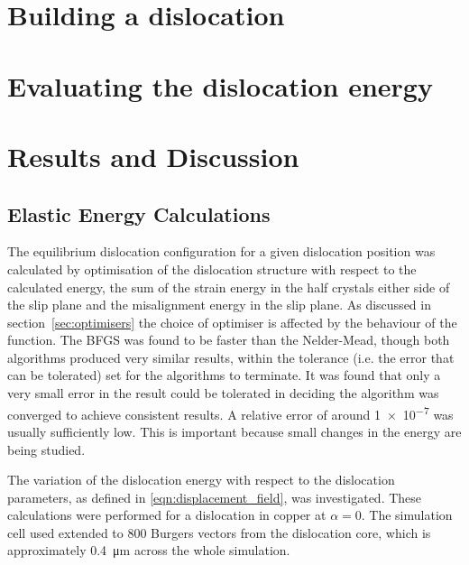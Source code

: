 \section{Building a dislocation}
\FloatBarrier
\label{sec:build}










\section{Evaluating the dislocation energy}
\label{sec:dislocation_energy}






\section{Results and Discussion}

\subsection{Elastic Energy Calculations}
\label{sec:elastic_results}

The equilibrium dislocation configuration for a given dislocation position was calculated by optimisation of the dislocation structure with respect to the calculated energy, the sum of the strain energy in the half crystals either side of the slip plane and the misalignment energy in the slip plane. As discussed in section~\ref{sec:optimisers} the choice of optimiser is affected by the behaviour of the function. The BFGS was found to be faster than the Nelder-Mead, though both algorithms produced very similar results, within the tolerance (i.e. the error that can be tolerated) set for the algorithms to terminate. It was found that only a very small error in the result could be tolerated in deciding the algorithm was converged to achieve consistent results. A relative error of around \num{1e-7} was usually sufficiently low. This is important because small changes in the energy are being studied. 

The variation of the dislocation energy with respect to the dislocation parameters, as defined in \autoref{eqn:displacement_field}, was investigated. These calculations were performed for a dislocation in copper at $\alpha=0$. The simulation cell used extended to \num{800} Burgers vectors from the dislocation core, which is approximately \SI{0.4}{\micro\meter} across the whole simulation.

